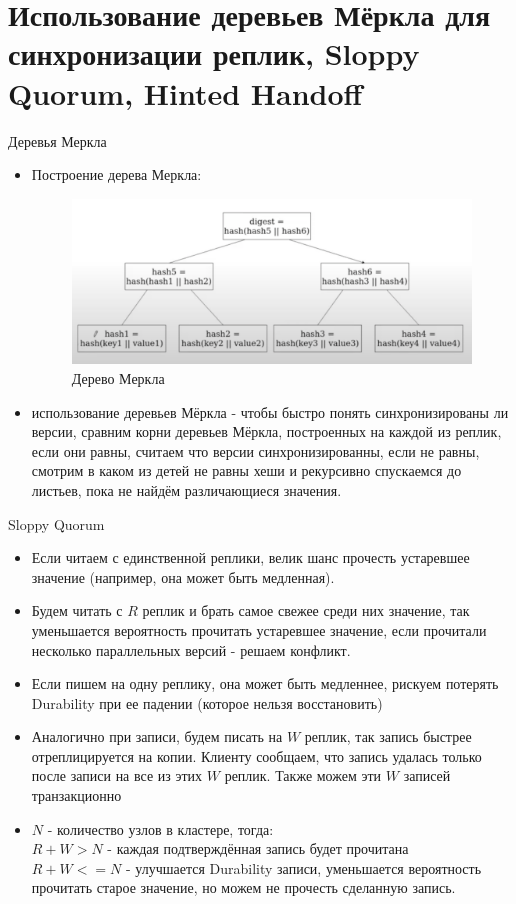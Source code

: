 \section{Использование деревьев Мёркла для синхронизации реплик, Sloppy Quorum, Hinted Handoff}
\begin{definition}
  Деревья Меркла
\end{definition}
\begin{itemize}
    \item Построение дерева Меркла:
    \begin{figure}[h]
        \centering
        \includegraphics[scale = 0.5]{../assets/17.png}
        \caption{Дерево Меркла}
    \end{figure}
    \item использование деревьев Мёркла - чтобы быстро понять синхронизированы ли версии, сравним корни деревьев Мёркла, построенных на каждой из реплик, если они равны, считаем что версии синхронизированны, если не равны, смотрим в каком из детей не равны хеши и рекурсивно спускаемся до листьев, пока не найдём различающиеся значения.
\end{itemize}
\begin{definition}
  Sloppy Quorum
\end{definition}
  \begin{itemize}
    \item Если читаем с единственной реплики, велик шанс прочесть устаревшее значение (например, она может быть медленная).
    \item Будем читать с $R$ реплик и брать самое свежее среди них значение, так уменьшается вероятность прочитать устаревшее значение, если прочитали несколько параллельных версий - решаем конфликт.
    \item Если пишем на одну реплику, она может быть медленнее, рискуем потерять Durability при ее падении (которое нельзя восстановить)
    \item Аналогично при записи, будем писать на $W$ реплик, так запись быстрее отреплицируется на копии. Клиенту сообщаем, что запись удалась только после записи на все из этих $W$ реплик. Также можем эти $W$ записей транзакционно \\
    \item $N$ - количество узлов в кластере, тогда: \\
        $R + W > N$ - каждая подтверждённая запись будет прочитана \\
        $R + W <= N$ - улучшается Durability записи, уменьшается вероятность прочитать старое значение, но можем не прочесть сделанную запись.
  \end{itemize}
